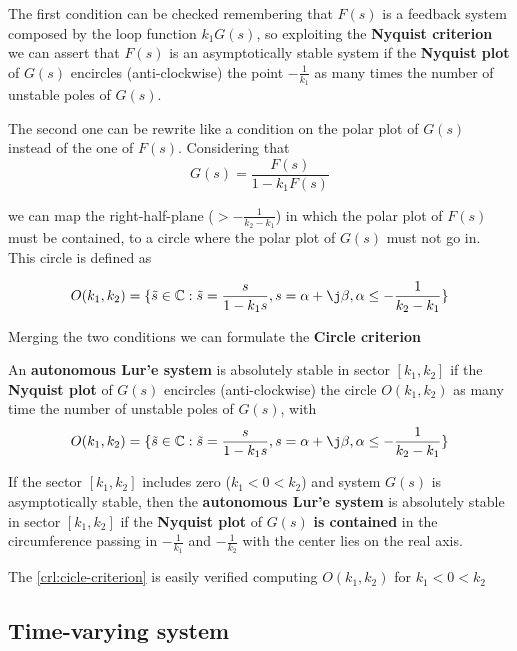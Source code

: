 The first condition can be checked remembering that $F(s)$ is a feedback system composed by the loop function $k_1 G(s)$, so exploiting the \textbf{Nyquist criterion} we can assert that $F(s)$ is an asymptotically stable system if the \textbf{Nyquist plot} of $G(s)$ encircles (anti-clockwise) the point $-\frac{1}{k_1}$ as many times the number of unstable poles of $G(s)$.

The second one can be rewrite like a condition on the polar plot of $G(s)$ instead of the one of $F(s)$. Considering that
\[
    G(s) = \frac{F(s)}{1 - k_1 F(s)}
\]

we can map the right-half-plane ($>-\frac{1}{k_2 - k_1}$) in which the polar plot of $F(s)$ must be contained, to a circle where the polar plot of $G(s)$ must not go in. This circle is defined as

\[
    O(k_1,k_2) = \{\tilde{s} \in \Complex : \tilde{s} = \frac{s}{1-k_1 s}, s = \alpha + \j \beta, \alpha \leq - \frac{1}{k_2 - k_1}\}
\]

Merging the two conditions we can formulate the \textbf{Circle criterion}

\begin{theorem}
    An \textbf{autonomous Lur'e system} is absolutely stable in sector $[k_1,k_2]$ if the \textbf{Nyquist plot} of $G(s)$ encircles (anti-clockwise) the circle $O(k_1, k_2)$ as many time the number of unstable poles of $G(s)$, with
    \[
        O(k_1,k_2) = \{\tilde{s} \in \Complex : \tilde{s} = \frac{s}{1-k_1 s}, s = \alpha + \j \beta, \alpha \leq - \frac{1}{k_2 - k_1}\}
    \]
\end{theorem}

\begin{corollary}\label{crl:cicle-criterion}
    If the sector $[k_1,k_2]$ includes zero ($k_1 < 0 < k_2$) and system $G(s)$ is asymptotically stable, then the \textbf{autonomous Lur'e system} is absolutely stable in sector $[k_1,k_2]$ if the \textbf{Nyquist plot} of $G(s)$ \textbf{is contained} in the circumference passing in $-\frac{1}{k_1}$ and $-\frac{1}{k_2}$ with the center lies on the real axis.
\end{corollary}

\begin{nb}The \cref{crl:cicle-criterion} is easily verified computing $O(k_1,k_2)$ for $k_1 < 0 < k_2$\end{nb}

\subsection{Time-varying system}

